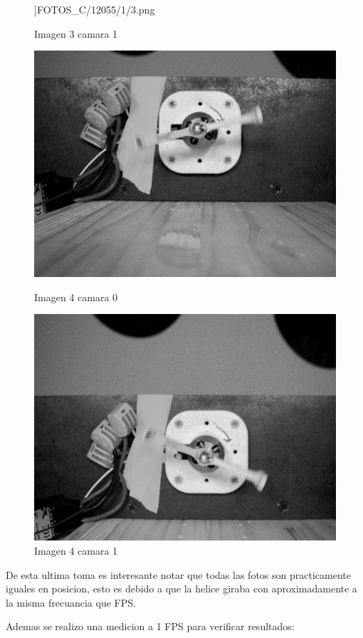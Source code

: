 \documentclass{article}
\begin{document}
\begin{figure}[H]
\begin{minipage}[b]{0.45\textwidth}
      \textwidth]{FOTOS_C/12055/1/3.png}
      \caption{Imagen 3 camara 1}
    \end{minipage}
    \begin{minipage}[b]{0.45\textwidth}
      \centering
      \includegraphics[width=0.8
      \textwidth]{FOTOS_C/12055/0/4.png}
      \caption{Imagen 4 camara 0}
    \end{minipage}
    \begin{minipage}[b]{0.45\textwidth}
      \centering
      \includegraphics[width=0.8
      \textwidth]{FOTOS_C/12055/1/4.png}
      \caption{Imagen 4 camara 1}
    \end{minipage}
\end{figure}

\noindent De esta ultima toma es interesante notar que todas las fotos son practicamente iguales en posicion, esto es debido a que 
la helice giraba con aproximadamente a la misma frecuancia que FPS.

\newpage
Ademas se realizo una medicion a 1 FPS para verificar resultados:
\end{document}
